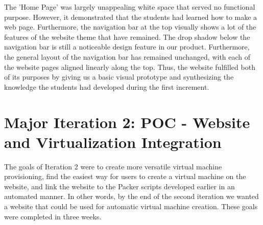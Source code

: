 \documentclass[openright]{report}
\begin{document}
\par The 'Home Page' was largely unappealing white space that served no functional purpose. However, it demonstrated that the students had learned how to make a web page. Furthermore, the navigation bar at the top visually shows a lot of the features of the website theme that have remained. The drop shadow below the navigation bar is still a noticeable design feature in our product. Furthermore, the general layout of the navigation bar has remained unchanged, with each of the website pages aligned linearly along the top. Thus, the website fulfilled both of its purposes by giving us a basic visual prototype and synthesizing the knowledge the students had developed during the first increment.

\section{Major Iteration 2: POC -  Website and Virtualization Integration}
\par The goals of Iteration 2 were to create more versatile virtual machine provisioning, find the easiest way for users to create a virtual machine on the website, and link the website to the Packer scripts developed earlier in an automated manner. In other words, by the end of the second iteration we wanted a website that could be used for automatic virtual machine creation. These goals were completed in three weeks.
\end{document}
